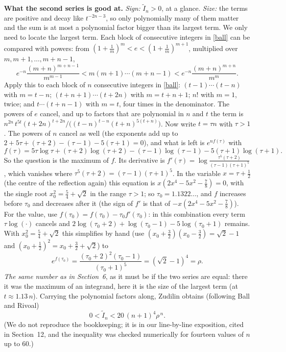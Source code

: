 \documentclass[11pt]{article}
\theoremstyle{remark}
\newcommand{\q}[1]{\medskip\noindent\textbf{#1}}
\begin{document}
\q{What the second series is good at.} \emph{Sign:} $\widetilde I_n>0$, at a glance.
\emph{Size:} the terms are positive and decay like $t^{-2n-3}$, so only polynomially many of
them matter and the sum is at most a polynomial factor bigger than its largest term. We only need to
locate the largest term. Each block of consecutive integers in \eqref{ball} can be compared with powers:
from $(1+\frac1m)^m<e<(1+\frac1m)^{m+1}$, multiplied over $m,m+1,\dots,m+n-1$,
\[
e^{-n}\frac{(m+n)^{m+n-1}}{m^{m-1}}<m(m+1)\cdots(m+n-1)<e^{-n}\frac{(m+n)^{m+n}}{m^m}.
\]
Apply this to each block of $n$ consecutive integers in \eqref{ball}: $(t-1)\cdots(t-n)$ with
$m=t-n$; $(t+n+1)\cdots(t+2n)$ with $m=t+n+1$; $n!$ with $m=1$, twice; and $t\cdots(t+n-1)$ with
$m=t$, four times in the denominator. The powers of $e$ cancel, and up to factors that are
polynomial in $n$ and $t$ the term is
$n^{2n}\,t^{5t}(t+2n)^{t+2n}\big/\bigl((t-n)^{t-n}(t+n)^{5(t+n)}\bigr)$. Now write $t=\tau n$ with
$\tau>1$. The powers of $n$ cancel as well (the exponents add up to
$2+5\tau+(\tau+2)-(\tau-1)-5(\tau+1)=0$), and what is left is $e^{nf(\tau)}$ with
\[
f(\tau)=5\tau\log\tau+(\tau+2)\log(\tau+2)-(\tau-1)\log(\tau-1)-5(\tau+1)\log(\tau+1).
\]
So the question is the maximum of $f$. Its derivative is
$f'(\tau)=\log\frac{\tau^5(\tau+2)}{(\tau-1)(\tau+1)^5}$, which vanishes where
$\tau^5(\tau+2)=(\tau-1)(\tau+1)^5$. In the variable $x=\tau+\frac12$ (the centre of the reflection
again) this equation is $x(2x^4-5x^2-\frac78)=0$, with the single root $x_0^2=\frac54+\sqrt2$ in
the range $\tau>1$; so $\tau_0=1.1322\ldots$, and $f$ increases before $\tau_0$ and decreases after
it (the sign of $f'$ is that of $-x(2x^4-5x^2-\frac78)$). For the value, use
$f(\tau_0)=f(\tau_0)-\tau_0f'(\tau_0)$: in this combination every term $\tau\log(\cdot)$ cancels and
$2\log(\tau_0+2)+\log(\tau_0-1)-5\log(\tau_0+1)$ remains. With $x_0^2=\frac54+\sqrt2$ this simplifies
by hand (use $(x_0+\frac32)(x_0-\frac32)=\sqrt2-1$ and $(x_0+\frac12)^2=x_0+\frac32+\sqrt2$) to
\[
e^{f(\tau_0)}=\frac{(\tau_0+2)^2(\tau_0-1)}{(\tau_0+1)^5}=(\sqrt2-1)^4=\rho .
\]
\emph{The same number as in Section~6}, as it must be if the two series are equal: there it was the
maximum of an integrand, here it is the size of the largest term (at $t\approx1.13\,n$). Carrying
the polynomial factors along, Zudilin obtains (following Ball and Rivoal)
\begin{equation}\label{ballbound}
0<\widetilde I_n<20\,(n+1)^4\rho^{\,n}.
\end{equation}
(We do not reproduce the bookkeeping; it is in our line-by-line exposition, cited in Section~12,
and the inequality was checked numerically for fourteen values of $n$ up to $60$.)
\end{document}
